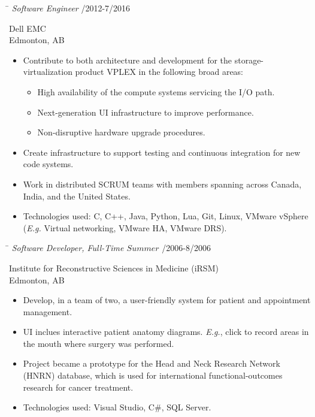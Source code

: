 \documentclass{res}
\begin{document}
\begin{resume}
    \vspace{-0.1in}
    \begin{tabbing}
    \hspace{5.15in}\= \kill  %
    \textit{Software Engineer} /2012-7/2016
    \end{tabbing}\vspace{-22pt}  %
    Dell EMC\\
    Edmonton, AB\\
    \vspace{-1.5ex}\begin{itemize}[noitemsep]
    \item Contribute to both architecture and development for the storage-virtualization product VPLEX in the following broad areas:
    \begin{itemize}[noitemsep]
    \item High availability of the compute systems servicing the I/O path.
    \item Next-generation UI infrastructure to improve performance.
    \item Non-disruptive hardware upgrade procedures.
    \end{itemize}
    \item Create infrastructure to support testing and continuous integration for new code systems.
    \item Work in distributed SCRUM teams with members spanning across Canada, India, and the United States.
    \item Technologies used: C, C++, Java, Python, Lua, Git, Linux, VMware vSphere (\textit{E.g.} Virtual networking, VMware HA, VMware DRS).
    \end{itemize}

    \vspace{-0.1in}
    \begin{tabbing}
    \hspace{5.15in}\= \kill  %
    \textit{Software Developer, Full-Time \(Summer\)} /2006-8/2006
    \end{tabbing}\vspace{-22pt}  %
    Institute for Reconstructive Sciences in Medicine (iRSM)\\
    Edmonton, AB\\
    \vspace{-1.5ex}\begin{itemize}[noitemsep]
    \item Develop, in a team of two, a user-friendly system for patient and appointment management.
    \item UI inclues interactive patient anatomy diagrams.  \textit{E.g.}, click to record areas in the mouth where surgery was performed.
    \item Project became a prototype for the Head and Neck Research Network (HNRN) database, which is used for international functional-outcomes research for cancer treatment.
    \item Technologies used: Visual Studio, C\#, SQL Server.
    \end{itemize}



\end{resume}
\end{document}
